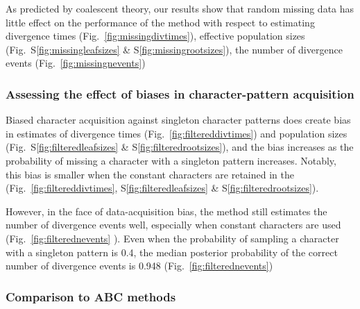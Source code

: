 As predicted by coalescent theory, our results show that random missing data
has little effect on the performance of the method with respect to estimating
divergence times
(Fig.~\ref{fig:missingdivtimes}),
effective population sizes
(Fig.\ 
S\ref{fig:missingleafsizes}
\&
S\ref{fig:missingrootsizes}),
 the number of divergence events
(Fig.~\ref{fig:missingnevents})

\ifembed{



}{}


\subsubsection{Assessing the effect of biases in character-pattern acquisition}

Biased character acquisition against singleton character patterns does create
bias in estimates of divergence times
(Fig.~\ref{fig:filtereddivtimes}) and
population sizes
(Fig.\ 
S\ref{fig:filteredleafsizes}
\&
S\ref{fig:filteredrootsizes}), and the bias increases as the probability of
missing a character with a singleton pattern increases.
Notably, this bias is smaller when the constant characters are retained in
the \dataset
(Fig.\ 
\ref{fig:filtereddivtimes},
S\ref{fig:filteredleafsizes}
\&
S\ref{fig:filteredrootsizes}).

\ifembed{

}{}

However, in the face of data-acquisition bias, the method still estimates the
number of divergence events  well,
especially when constant characters are used
(Fig.~\ref{fig:filterednevents}
\jroedit{}{\&
S\ref{fig:filteredmodels}}).
Even when the probability of sampling a character with a singleton pattern is
0.4, the median posterior probability of the correct number of divergence
events is 0.948
(Fig.~\ref{fig:filterednevents})

\ifembed{

}{}

\subsubsection{Comparison to ABC methods}

